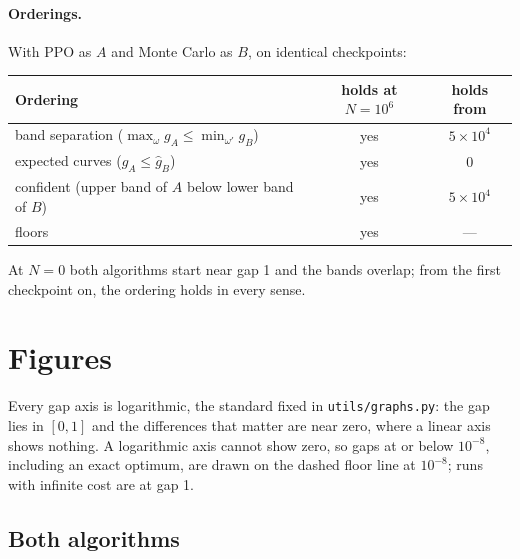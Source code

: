 \documentclass[11pt]{article}
\begin{document}
\paragraph{Orderings.} With PPO as $A$ and Monte Carlo as $B$, on identical checkpoints:
\begin{center}
  \begin{tabular}{@{}lcc@{}}
    \toprule
    Ordering & holds at $N = 10^6$ & holds from \\
    \midrule
    band separation ($\max_\omega g_A \le \min_{\omega'} g_B$) & yes & $5 \times 10^4$ \\
    expected curves ($\hat g_A \le \hat g_B$) & yes & $0$ \\
    confident (upper band of $A$ below lower band of $B$) & yes & $5 \times 10^4$ \\
    floors & yes & --- \\
    \bottomrule
  \end{tabular}
\end{center}
At $N = 0$ both algorithms start near gap 1 and the bands overlap; from the first checkpoint on, the
ordering holds in every sense.

\section{Figures}
\label{sec:figures}

Every gap axis is logarithmic, the standard fixed in \texttt{utils/graphs.py}: the gap lies in
$[0, 1]$ and the differences that matter are near zero, where a linear axis shows nothing. A
logarithmic axis cannot show zero, so gaps at or below $10^{-8}$, including an exact optimum, are
drawn on the dashed floor line at $10^{-8}$; runs with infinite cost are at gap 1.

\subsection{Both algorithms}
\end{document}
